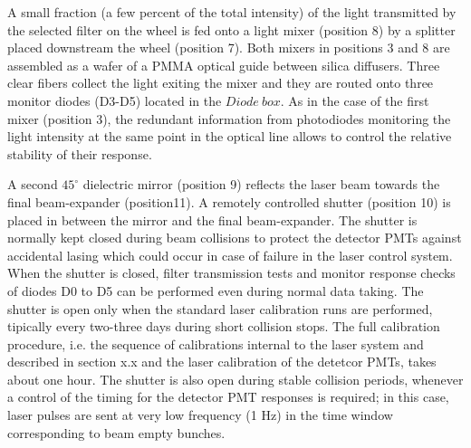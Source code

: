  A small fraction (a few percent of the total intensity) of the light transmitted by
the selected filter on the wheel is fed onto a light mixer (position 8) by a
splitter placed downstream the wheel (position 7). Both mixers in positions 3 and 8
are assembled as a wafer of a PMMA optical guide between silica diffusers.
Three clear fibers collect the light exiting the mixer and they are routed onto
three monitor diodes (D3-D5) located in the $Diode ~box$. As in the case of the
first mixer (position 3), the redundant information from photodiodes monitoring the
light intensity at the same point in the optical line allows to control the relative
stability of their response. 

A second $45^{\circ}$ dielectric mirror (position 9) reflects the laser beam towards
the final beam-expander (position11). A remotely controlled shutter (position 10) is
placed in between the mirror and the final beam-expander. The shutter is normally
kept closed during beam collisions to protect the detector PMTs against accidental
lasing which could occur in case of failure in the laser control system. When the
shutter is closed, filter transmission tests and monitor response checks of diodes
D0 to D5 can be performed even during normal data taking. The shutter is open only
when the standard laser calibration runs are performed, tipically every two-three
days during short collision stops. The full calibration procedure, i.e. the sequence
of calibrations internal to the laser system and described in section x.x and the
laser calibration of the detetcor PMTs, takes about one hour. The shutter is also
open during stable collision periods, whenever a control of the timing for the
detector PMT responses is required; in this case, laser pulses are sent at very low
frequency (1 Hz) in the time window corresponding to
beam empty bunches. 

